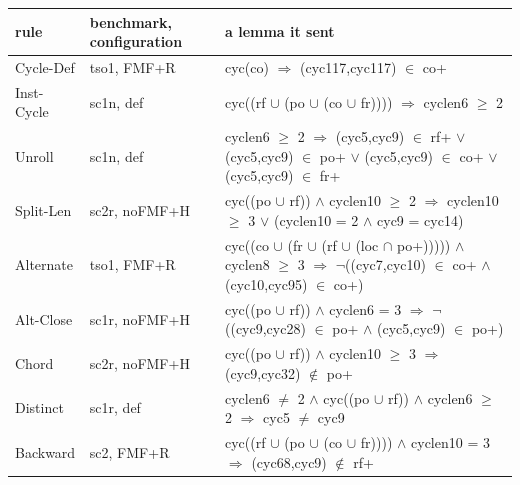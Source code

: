 \begin{tabular}{@{}p{2.2cm}p{2.0cm}p{9.6cm}@{}}
\toprule
rule & benchmark, configuration & a lemma it sent \\
\midrule
Cycle-Def & tso1, FMF+R & {\ttfamily\raggedright cyc(co) $\Rightarrow$ (cyc117,cyc117) $\in$ co+} \\
Inst-Cycle & sc1n, def & {\ttfamily\raggedright cyc((rf $\cup$ (po $\cup$ (co $\cup$ fr)))) $\Rightarrow$ cyclen6 $\ge$ 2} \\
Unroll & sc1n, def & {\ttfamily\raggedright cyclen6 $\ge$ 2 $\Rightarrow$ (cyc5,cyc9) $\in$ rf+ $\vee$ (cyc5,cyc9) $\in$ po+ $\vee$ (cyc5,cyc9) $\in$ co+ $\vee$ (cyc5,cyc9) $\in$ fr+} \\
Split-Len & sc2r, noFMF+H & {\ttfamily\raggedright cyc((po $\cup$ rf)) $\wedge$ cyclen10 $\ge$ 2 $\Rightarrow$ cyclen10 $\ge$ 3 $\vee$ (cyclen10 = 2 $\wedge$ cyc9 = cyc14)} \\
Alternate & tso1, FMF+R & {\ttfamily\raggedright cyc((co $\cup$ (fr $\cup$ (rf $\cup$ (loc $\cap$ po+))))) $\wedge$ cyclen8 $\ge$ 3 $\Rightarrow$ $\neg$((cyc7,cyc10) $\in$ co+ $\wedge$ (cyc10,cyc95) $\in$ co+)} \\
Alt-Close & sc1r, noFMF+H & {\ttfamily\raggedright cyc((po $\cup$ rf)) $\wedge$ cyclen6 = 3 $\Rightarrow$ $\neg$((cyc9,cyc28) $\in$ po+ $\wedge$ (cyc5,cyc9) $\in$ po+)} \\
Chord & sc2r, noFMF+H & {\ttfamily\raggedright cyc((po $\cup$ rf)) $\wedge$ cyclen10 $\ge$ 3 $\Rightarrow$ (cyc9,cyc32) $\notin$ po+} \\
Distinct & sc1r, def & {\ttfamily\raggedright cyclen6 $\ne$ 2 $\wedge$ cyc((po $\cup$ rf)) $\wedge$ cyclen6 $\ge$ 2 $\Rightarrow$ cyc5 $\ne$ cyc9} \\
Backward & sc2, FMF+R & {\ttfamily\raggedright cyc((rf $\cup$ (po $\cup$ (co $\cup$ fr)))) $\wedge$ cyclen10 = 3 $\Rightarrow$ (cyc68,cyc9) $\notin$ rf+} \\
\bottomrule
\end{tabular}
